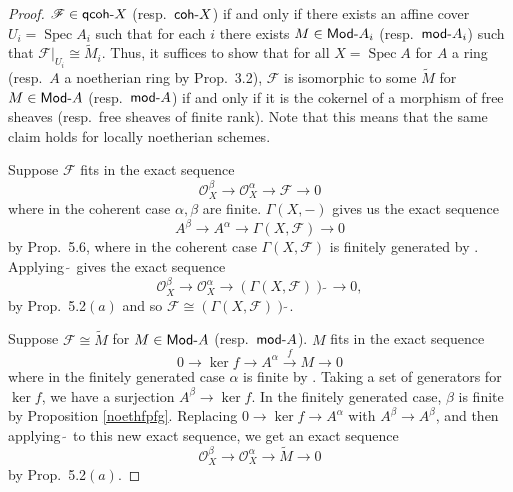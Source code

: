 \documentclass[12pt,letterpaper]{article}
\theoremstyle{definition}
\theoremstyle{remark}
\numberwithin{equation}{section}
\numberwithin{figure}{problem}
\DeclareMathOperator{\Spec}{Spec}
\newcommand{\FF}{\mathscr{F}}
\newcommand{\OO}{\mathcal{O}}
\newcommand{\Mod}{\mathsf{mod}\mathchar`-}
\newcommand{\MOD}{\mathsf{Mod}\mathchar`-}
\newcommand{\qcoh}{\mathsf{qcoh}\mathchar`-}
\newcommand{\coh}{\mathsf{coh}\mathchar`-}
\begin{document}
\begin{proof}
  $\FF \in \qcoh X$ (resp.~$\coh X$) if and only if there exists an affine cover $U_i = \Spec A_i$ such that for each $i$ there exists $M \in \MOD A_i$ (resp.~$\Mod A_i$) such that $\FF\vert_{U_i} \cong \tilde{M}_i$. Thus, it suffices to show that for all $X = \Spec A$ for $A$ a ring (resp.~$A$ a noetherian ring by Prop.~3.2), $\FF$ is isomorphic to some $\tilde{M}$ for $M \in \MOD A$ (resp.~$\Mod A$) if and only if it is the cokernel of a morphism of free sheaves (resp.~free sheaves of finite rank). Note that this means that the same claim holds for locally noetherian schemes.
  \par Suppose $\FF$ fits in the exact sequence
  \begin{equation*}
    \OO_X^\beta \longrightarrow \OO_X^\alpha \longrightarrow \FF \longrightarrow 0
  \end{equation*}
  where in the coherent case $\alpha,\beta$ are finite. $\Gamma(X,-)$ gives us the exact sequence
  \begin{equation*}
    A^\beta \longrightarrow A^\alpha \longrightarrow \Gamma(X,\FF) \longrightarrow 0
  \end{equation*}
  by Prop.~5.6, where in the coherent case $\Gamma(X,\FF)$ is finitely generated by \cite[Prop.~2.3]{AM69}. Applying $\tilde{~}$ gives the exact sequence
  \begin{equation*}
    \OO_X^\beta \longrightarrow \OO_X^\alpha \longrightarrow (\Gamma(X,\FF))\tilde{~} \longrightarrow 0,
  \end{equation*}
  by Prop.~5.2$(a)$ and so $\FF \cong (\Gamma(X,\FF))\tilde{~}$.
  \par Suppose $\FF \cong \tilde{M}$ for $M \in \MOD A$ (resp.~$\Mod A$). $M$ fits in the exact sequence
  \begin{equation*}
    0 \longrightarrow \ker f \longrightarrow A^\alpha \overset{f}{\longrightarrow} M \longrightarrow 0
  \end{equation*}
  where in the finitely generated case $\alpha$ is finite by \cite[Prop.~2.3]{AM69}. Taking a set of generators for $\ker f$, we have a surjection $A^\beta \to \ker f$. In the finitely generated case, $\beta$ is finite by Proposition \ref{noethfpfg}. Replacing $0 \to \ker f \to A^\alpha$ with $A^\beta \to A^\beta$, and then applying $\tilde{~}$ to this new exact sequence, we get an exact sequence
  \begin{equation*}
    \OO_X^\beta \longrightarrow\OO_X^\alpha \longrightarrow \tilde{M} \longrightarrow 0
  \end{equation*}
  by Prop.~5.2$(a)$.
\end{proof}
\end{document}
